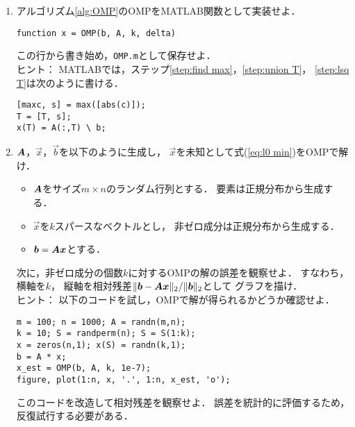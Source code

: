\begin{enumerate}
\item
アルゴリズム\ref{alg:OMP}のOMPをMATLAB関数として実装せよ．
\lstset{xleftmargin=4ex,xrightmargin=4ex}
\begin{lstlisting}
function x = OMP(b, A, k, delta)
\end{lstlisting}
この行から書き始め，{\tt OMP.m}として保存せよ．\\
ヒント：
MATLABでは，ステップ\ref{step:find max}，\ref{step:union T}，
\ref{step:lsq T}は次のように書ける．
\begin{lstlisting}
[maxc, s] = max([abs(c)]);
T = [T, s];
x(T) = A(:,T) \ b;
\end{lstlisting}

\item \label{ex:random sparse solution}
$\mbox{\boldmath $A$}$，$\vec x$，$\vec b$を以下のように生成し，
$\vec x$を未知として式(\ref{eq:l0 min})をOMPで解け．
\begin{itemize}
\item
$\mbox{\boldmath $A$}$をサイズ$m\times n$のランダム行列とする．
要素は正規分布から生成する．
\item
$\vec x$を$k$スパースなベクトルとし，
非ゼロ成分は正規分布から生成する．
\item $\mbox{\boldmath $b$}=\mbox{\boldmath $A$}\mbox{\boldmath $x$}$とする．
\end{itemize}
次に，非ゼロ成分の個数$k$に対するOMPの解の誤差を観察せよ．
すなわち，横軸を$k$，
縦軸を相対残差$\|\mbox{\boldmath $b$}-\mbox{\boldmath $A$}\mbox{\boldmath $x$}\|_2/\|\mbox{\boldmath $b$}\|_2$として
グラフを描け．\\
ヒント：
以下のコードを試し，OMPで解が得られるかどうか確認せよ．
\begin{lstlisting}
m = 100; n = 1000; A = randn(m,n);
k = 10; S = randperm(n); S = S(1:k);
x = zeros(n,1); x(S) = randn(k,1);
b = A * x;
x_est = OMP(b, A, k, 1e-7);
figure, plot(1:n, x, '.', 1:n, x_est, 'o');
\end{lstlisting}
このコードを改造して相対残差を観察せよ．
誤差を統計的に評価するため，反復試行する必要がある．


\end{enumerate}

